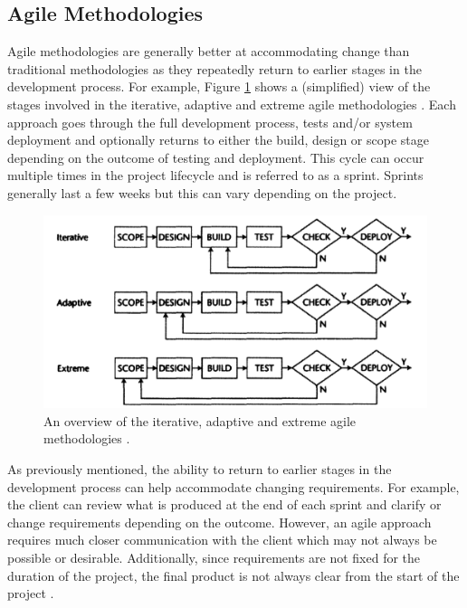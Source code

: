 \documentclass{UoYCSproject}
\begin{document}
\subsection{Agile Methodologies} \label{agile_meth}
Agile methodologies are generally better at accommodating change than traditional methodologies as they repeatedly return to earlier stages in the development process. For example, Figure \ref{fig:agile_meths} shows a (simplified) view of the stages involved in the iterative, adaptive and extreme agile methodologies \parencite{fernandez2008agile}. Each approach goes through the full development process, tests and/or system deployment and optionally returns to either the build, design or scope stage depending on the outcome of testing and deployment. This cycle can occur multiple times in the project lifecycle and is referred to as a sprint. Sprints generally last a few weeks but this can vary depending on the project.

\begin{figure}[h!]
  \includegraphics[width=\linewidth]{graphics/agile_methodologies.png}
  \caption{An overview of the iterative, adaptive and extreme agile methodologies \parencite{fernandez2008agile}.}
  \label{fig:agile_meths}
\end{figure}

As previously mentioned, the ability to return to earlier stages in the development process can help accommodate changing requirements. For example, the client can review what is produced at the end of each sprint and clarify or change requirements depending on the outcome. However, an agile approach requires much closer communication with the client which may not always be possible or desirable. Additionally, since requirements are not fixed for the duration of the project, the final product is not always clear from the start of the project \parencite{fernandez2008agile}.
\end{document}
